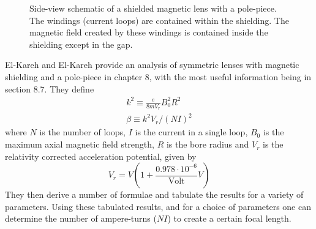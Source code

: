 \begin{figure}
\centering
{}
\caption{Side-view schematic of a shielded magnetic lens with a pole-piece. The windings (current loops) are contained within the shielding. The magnetic field created by these windings is contained inside the shielding except in the gap.}
\end{figure}

El-Kareh and El-Kareh \cite{el-kareh_electron_1970} provide an analysis of symmetric lenses with magnetic shielding and a pole-piece in chapter 8, with the most useful information being in section 8.7.
They define
\begin{subequations}
\begin{gather}
  k^2 \equiv \frac{e}{8 m V_r} B_0^2 R^2 \\
  \beta \equiv k^2 V_r / (NI)^2 \label{eq:elkareh_k2}
\end{gather}
\end{subequations}
where $N$ is the number of loops, $I$ is the current in a single loop, $B_0$ is the maximum axial magnetic field strength, $R$ is the bore radius and $V_r$ is the relativity corrected acceleration potential, given by
\begin{equation}
  V_r = V ( 1 + \frac{0.978 \cdot 10^{-6}}{\text{Volt}} V )
\end{equation}
They then derive a number of formulae and tabulate the results for a variety of parameters.
Using these tabulated results, and for a choice of parameters one can determine the number of ampere-turns ($NI$) to create a certain focal length.

